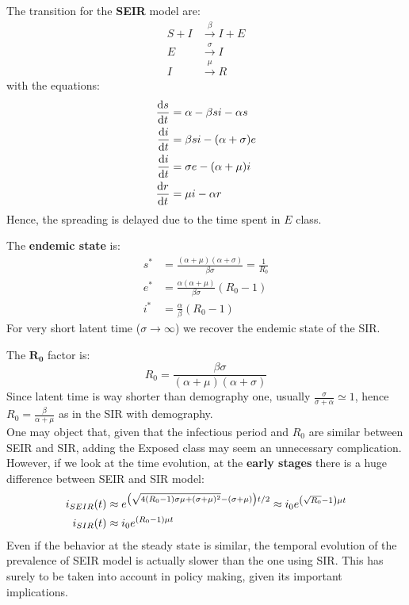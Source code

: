 \documentclass[../main/main.tex]{subfiles}
\begin{document}
The transition for the \textbf{SEIR} model are:
\begin{equation}
\begin{split}
 S + I &\overset{\beta }{\rightarrow } I + E   \\
 E & \overset{\sigma }{\rightarrow } I  \\
 I & \overset{\mu }{\rightarrow } R
\end{split}
\end{equation}
with the equations:
\begin{equation}
  \begin{split}
    \dv{s}{t} &= \alpha -\beta s i - \alpha s \\
  \dv{i}{t} &= \beta s i - (\alpha + \sigma )e \\
  \dv{i}{t} &= \sigma e - (\alpha + \mu )i \\
  \dv{r}{t} &= \mu i - \alpha r
\end{split}
\end{equation}
Hence, the spreading is delayed due to the time spent in \( E \) class.

The \textbf{endemic state} is:
\begin{equation}
\begin{split}
s^*  &=  \frac{(\alpha +\mu )(\alpha + \sigma )}{\beta \sigma } = \frac{1}{R_0} \\
e^* &= \frac{\alpha (\alpha +\mu )}{\beta \sigma } (R_0 -1)\\
i^* &= \frac{\alpha }{\beta } (R_0 -1)
\end{split}
\end{equation}
For very short latent time (\( \sigma \rightarrow \infty  \)) we recover the endemic state of the SIR.

The \( \mathbf{R_0} \) factor is:
\begin{equation}
  R_0 = \frac{\beta \sigma }{(\alpha + \mu )(\alpha +\sigma )}
\end{equation}
Since latent time is way shorter than demography one, usually \( \frac{\sigma }{\sigma + \alpha } \simeq 1 \), hence \( R_0 = \frac{\beta }{\alpha + \mu } \) as in the SIR with demography.\\

One may object that, given that the infectious period and $R_0$ are similar between SEIR and SIR, adding the Exposed class may seem an unnecessary complication. However, if we look at the time evolution, at the \textbf{early stages} there is a huge difference between SEIR and SIR model:
\begin{equation}
\begin{split}
  i_{SEIR} (t) & \approx e^{\qty(\sqrt{4(R_0-1)\sigma \mu  + (\sigma + \mu )^2} -(\sigma +\mu ))t/2 } \approx i_0 e^{\qty(\sqrt{R_0} -1 ) \mu t} \\
    i_{SIR} (t) &\approx i_0 e^{(R_0-1) \mu t}
\end{split}
\end{equation}
Even if the behavior at the steady state is similar, the temporal evolution of the prevalence of SEIR model is actually slower than the one using SIR. This has surely to be taken into account in policy making, given its important implications.
\end{document}
